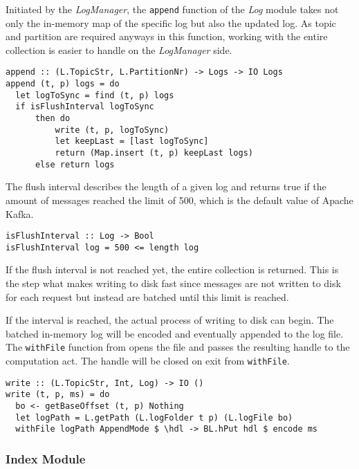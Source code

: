 Initiated by the \textit{LogManager}, the \lstinline{append} function of the
\textit{Log} module takes not only the in-memory map of the specific log but
also the updated log. As topic and partition are required anyways in this
function, working with the entire collection is easier to handle on the
\textit{LogManager} side.

\begin{lstlisting}[caption={Append messages to log}]
append :: (L.TopicStr, L.PartitionNr) -> Logs -> IO Logs
append (t, p) logs = do
  let logToSync = find (t, p) logs
  if isFlushInterval logToSync
      then do
          write (t, p, logToSync)
          let keepLast = [last logToSync]
          return (Map.insert (t, p) keepLast logs)
      else return logs
\end{lstlisting}

The flush interval describes the length of a given log and returns true if the
amount of messages reached the limit of 500, which is the default value of
Apache Kafka.

\begin{lstlisting}[caption={Check if enough messages are given for flush to disk}]
isFlushInterval :: Log -> Bool
isFlushInterval log = 500 <= length log
\end{lstlisting}

If the flush interval is not reached yet, the entire collection is returned.
This is the step what makes writing to disk fast since messages are
not written to disk for each request but instead are batched until this limit is
reached.

If the interval is reached, the actual process of writing to disk can begin.
The batched in-memory log will be encoded and eventually appended to the log
file. The \lstinline{withFile} function from  opens
the file and passes the resulting handle to the computation act. The handle
will be closed on exit from \lstinline{withFile}.

\begin{lstlisting}[caption={Write message to file with AppendMode}]
write :: (L.TopicStr, Int, Log) -> IO ()
write (t, p, ms) = do
  bo <- getBaseOffset (t, p) Nothing
  let logPath = L.getPath (L.logFolder t p) (L.logFile bo)
  withFile logPath AppendMode $ \hdl -> BL.hPut hdl $ encode ms
\end{lstlisting}

\subsubsection{Index Module}

